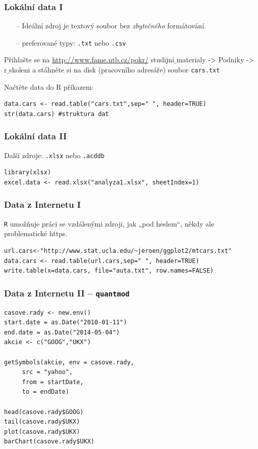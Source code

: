 \documentclass[10pt,xcolor={dvipsnames}]{beamer}
\begin{document}
\begin{frame}[fragile]
\frametitle{Lokální data I}
\begin{itemize}
\item[--] Ideální zdroj je textový soubor bez \emph{zbytečného} formátování.
\item[--] preferované typy: \texttt{.txt} nebo \texttt{.csv}
\end{itemize}

\textcolor{NavyBlue}{Přihlašte se na \newline
\url{http://www.fame.utb.cz/pokr/}\newline\smallskip
studijni$\_$materialy -> Podniky -> r$\_$skoleni} \newline
a stáhněte si na disk (pracovního adresáře) soubor \texttt{cars.txt}\newline

Načtěte data do R příkazem:
\begin{verbatim}
data.cars <- read.table("cars.txt",sep=" ", header=TRUE)
str(data.cars) #struktura dat
\end{verbatim}
\end{frame}

\begin{frame}[fragile]
\frametitle{Lokální data II}
Další zdroje: \texttt{.xlsx} nebo \texttt{.acddb}
\begin{verbatim}
library(xlsx)
excel.data <- read.xlsx("analyza1.xlsx", sheetIndex=1)
\end{verbatim} 
\end{frame}

\begin{frame}[fragile]
\frametitle{Data z Internetu I}
\texttt{R} umožňuje práci se vzdálenými zdroji, jak „pod heslem“, někdy ale problematické http\textcolor{WildStrawberry}{s}.

\begin{verbatim}
url.cars<-"http://www.stat.ucla.edu/~jeroen/ggplot2/mtcars.txt"
data.cars <- read.table(url.cars,sep=" ", header=TRUE)
write.table(x=data.cars, file="auta.txt", row.names=FALSE)
\end{verbatim} 
\end{frame}

\begin{frame}[fragile]
\frametitle{Data z Internetu II -- \texttt{quantmod}}
\begin{verbatim}
casove.rady <- new.env()
start.date = as.Date("2010-01-11") 
end.date = as.Date("2014-05-04")
akcie <- c("GOOG","UKX")

getSymbols(akcie, env = casove.rady,
	 src = "yahoo",
	 from = startDate,
	 to = endDate)

head(casove.rady$GOOG)
tail(casove.rady$UKX)
plot(casove.rady$UKX)
barChart(casove.rady$UKX)
\end{verbatim} 
\end{frame}
\end{document}
